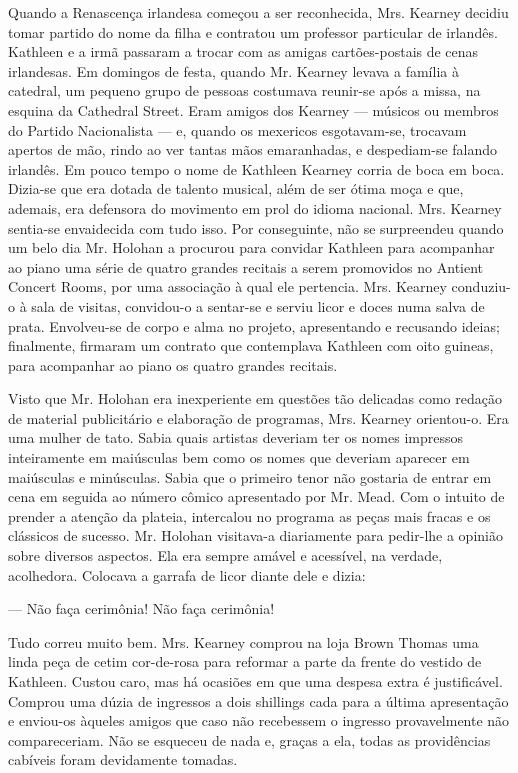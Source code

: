 Quando a Renascença irlandesa começou a ser reconhecida, Mrs. Kearney
decidiu tomar partido do nome da filha e contratou um professor
particular de irlandês. Kathleen e a irmã passaram a trocar com as
amigas cartões-postais de cenas irlandesas. Em domingos de festa,
quando Mr. Kearney levava a família à catedral, um pequeno grupo de
pessoas costumava reunir-se após a missa, na esquina da Cathedral
Street. Eram amigos dos Kearney
--- músicos ou membros do Partido Nacionalista --- e, quando os
mexericos esgotavam-se, trocavam apertos de mão, rindo ao ver tantas
mãos emaranhadas, e despediam-se falando irlandês. Em pouco tempo o
nome de Kathleen Kearney corria de boca em boca. Dizia-se que era
dotada de talento musical, além de ser ótima moça e que, ademais, era
defensora do movimento em prol do idioma nacional. Mrs. Kearney
sentia-se envaidecida com tudo isso. Por conseguinte, não se
surpreendeu quando um belo dia Mr. Holohan a procurou para convidar
Kathleen para acompanhar ao piano uma série de quatro grandes recitais
a serem promovidos no Antient Concert Rooms, por uma associação à qual
ele pertencia. Mrs. Kearney conduziu-o à sala de visitas, convidou-o
a sentar-se e serviu licor e doces numa salva de prata. Envolveu-se de
corpo e alma no projeto, apresentando e recusando ideias; finalmente,
firmaram um contrato que contemplava Kathleen com oito guineas, para
acompanhar ao piano os quatro grandes recitais.

Visto que Mr. Holohan era inexperiente em questões tão delicadas
como redação de material publicitário e elaboração de programas, Mrs.
Kearney orientou-o. Era uma mulher de tato. Sabia quais artistas
deveriam ter os nomes impressos inteiramente em maiúsculas bem como os
nomes que deveriam aparecer em maiúsculas e minúsculas. Sabia que o
primeiro tenor não gostaria de entrar em cena em seguida ao número
cômico apresentado por Mr. Mead. Com o intuito de prender a atenção
da plateia, intercalou no programa as peças mais fracas e os
clássicos de sucesso. Mr. Holohan visitava-a diariamente para
pedir-lhe a opinião sobre diversos aspectos. Ela era sempre amável e
acessível, na verdade, acolhedora. Colocava a garrafa de licor diante
dele e dizia:

--- Não faça cerimônia! Não faça cerimônia!

Tudo correu muito bem. Mrs. Kearney comprou na loja Brown Thomas uma
linda peça de cetim cor-de-rosa para reformar a parte da frente do
vestido de Kathleen. Custou caro, mas há ocasiões em que uma despesa
extra é justificável. Comprou uma dúzia de ingressos a dois shillings
cada para a última apresentação e enviou-os àqueles amigos que caso
não recebessem o ingresso provavelmente não compareceriam. Não se
esqueceu de nada
e, graças a ela, todas as providências cabíveis foram devidamente
tomadas.


